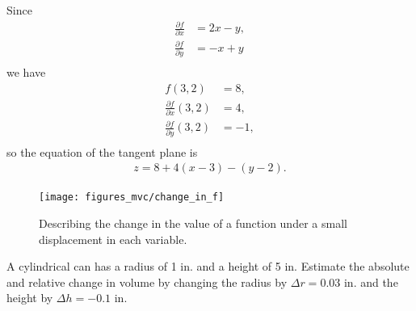 \documentclass[12pt,letterpaper,reqno]{article}
\numberwithin{equation}{section}
\begin{document}
{{\color{red}
\begin{solution}
Since
\begin{align*}
	\frac{\partial f}{\partial x}&=2x-y, \\
	\frac{\partial f}{\partial y}&=-x+y \\
\end{align*}
we have
\begin{align*}
	f(3,2)&=8, \\
	\frac{\partial f}{\partial x}(3,2)&=4, \\
	\frac{\partial f}{\partial y}(3,2)&=-1, \\
\end{align*}	
so the equation of the tangent plane is
\begin{align*}
	z=8+4(x-3)-(y-2).
\end{align*}
\end{solution}
}

\begin{figure}[h]
	\centering
	\texttt{[image: figures\_mvc/change\_in\_f]}
	\caption{Describing the change in the value of a function under a small displacement in each variable.}
\end{figure}

\begin{example}
A cylindrical can has a radius of 1 in. and a height of 5 in. Estimate the absolute and relative change in volume by changing the radius by $\Delta r=0.03$ in. and the height by $\Delta h=-0.1$ in.	


\end{example}}
\end{document}

